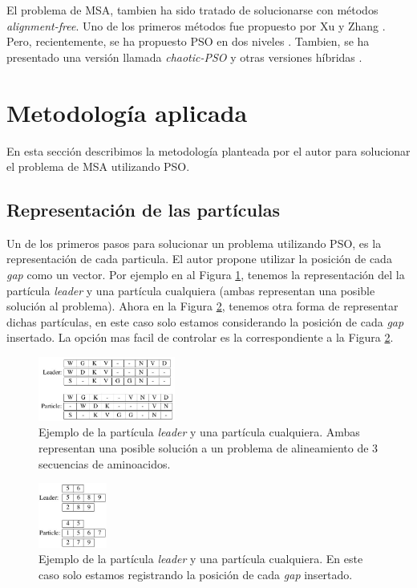 \documentclass[conference]{IEEEtran}
\begin{document}
El problema de MSA, tambien ha sido tratado de solucionarse con métodos \textit{alignment-free}. Uno de los primeros métodos fue propuesto por Xu \cite{xu2009method} y Zhang \cite{hongwei2005pso}. Pero, recientemente, se ha propuesto PSO en dos niveles \cite{lalwani2017efficient, lalwani2019efficient}. Tambien, se ha presentado una versión llamada \textit{chaotic-PSO} \cite{lei2009multiple} y otras versiones híbridas \cite{rasmussen2003improved, chaabane2018hybrid}. 

\section{Metodología aplicada}

En esta sección describimos la metodología planteada por el autor para solucionar el problema de MSA utilizando PSO.

\subsection{Representación de las partículas}

Un de los primeros pasos para solucionar un problema utilizando PSO, es la representación de cada particula. El autor propone utilizar la posición de cada \textit{gap} como un vector. Por ejemplo en al Figura \ref{fig:pso_1}, tenemos la representación del la partícula \textit{leader} y una partícula cualquiera (ambas representan una posible solución al problema). Ahora en la Figura  \ref{fig:pso_2}, tenemos otra forma de representar dichas partículas, en este caso solo estamos considerando la posición de cada \textit{gap} insertado. La opción mas facil de controlar es la correspondiente a la Figura \ref{fig:pso_2}. \\

\begin{figure}[h]
	\centering
	\includegraphics[width=0.4\textwidth]{images/pso_1}
	\caption{Ejemplo de la partícula \textit{leader} y una partícula cualquiera. Ambas representan una posible solución a un problema de alineamiento de 3 secuencias de aminoacidos.}
	\label{fig:pso_1}
\end{figure}

\begin{figure}[h]
	\centering
	\includegraphics[width=0.2\textwidth]{images/pso_2}
	\caption{Ejemplo de la partícula \textit{leader} y una partícula cualquiera. En este caso solo estamos registrando la posición de cada \textit{gap } insertado.}
	\label{fig:pso_2}
\end{figure}
\end{document}
